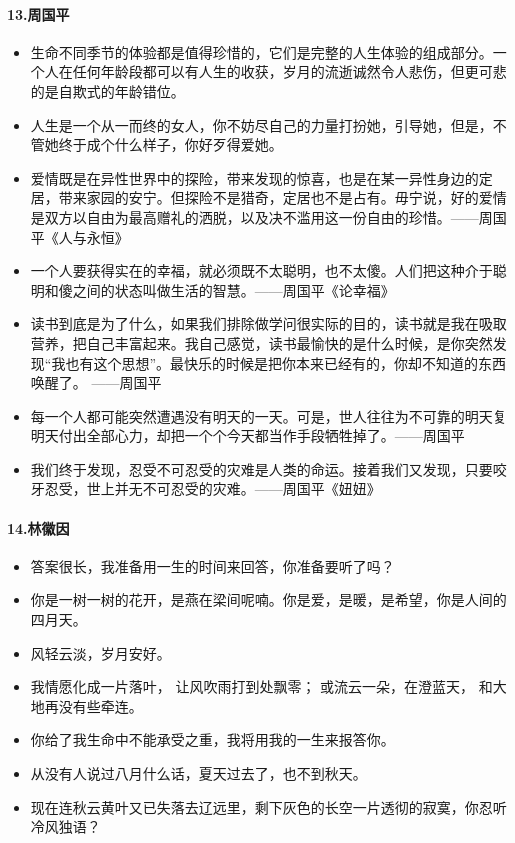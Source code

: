 \documentclass[UTF8,a4paper,8pt]{ctexart}
\begin{document}
 \paragraph{13.周国平}
 \begin{itemize}
 	\item 生命不同季节的体验都是值得珍惜的，它们是完整的人生体验的组成部分。一个人在任何年龄段都可以有人生的收获，岁月的流逝诚然令人悲伤，但更可悲的是自欺式的年龄错位。
 	\item 人生是一个从一而终的女人，你不妨尽自己的力量打扮她，引导她，但是，不管她终于成个什么样子，你好歹得爱她。
 	\item 爱情既是在异性世界中的探险，带来发现的惊喜，也是在某一异性身边的定居，带来家园的安宁。但探险不是猎奇，定居也不是占有。毋宁说，好的爱情是双方以自由为最高赠礼的洒脱，以及决不滥用这一份自由的珍惜。——周国平《人与永恒》
 	\item 一个人要获得实在的幸福，就必须既不太聪明，也不太傻。人们把这种介于聪明和傻之间的状态叫做生活的智慧。——周国平《论幸福》
 	\item 读书到底是为了什么，如果我们排除做学问很实际的目的，读书就是我在吸取营养，把自己丰富起来。我自己感觉，读书最愉快的是什么时候，是你突然发现“我也有这个思想”。最快乐的时候是把你本来已经有的，你却不知道的东西唤醒了。 ——周国平
 	\item 每一个人都可能突然遭遇没有明天的一天。可是，世人往往为不可靠的明天复明天付出全部心力，却把一个个今天都当作手段牺牲掉了。——周国平
 	
 	\item 我们终于发现，忍受不可忍受的灾难是人类的命运。接着我们又发现，只要咬牙忍受，世上并无不可忍受的灾难。——周国平《妞妞》
 \end{itemize}
 
 \paragraph{14.林徽因}
 \begin{itemize}
 	\item  答案很长，我准备用一生的时间来回答，你准备要听了吗？
 	\item  你是一树一树的花开，是燕在梁间呢喃。你是爱，是暖，是希望，你是人间的四月天。
 	\item  风轻云淡，岁月安好。
 	\item  我情愿化成一片落叶， 让风吹雨打到处飘零； 或流云一朵，在澄蓝天， 和大地再没有些牵连。
 	\item  你给了我生命中不能承受之重，我将用我的一生来报答你。
 	\item  从没有人说过八月什么话，夏天过去了，也不到秋天。
 	\item  现在连秋云黄叶又已失落去辽远里，剩下灰色的长空一片透彻的寂寞，你忍听冷风独语？
 \end{itemize}
 
\end{document}
